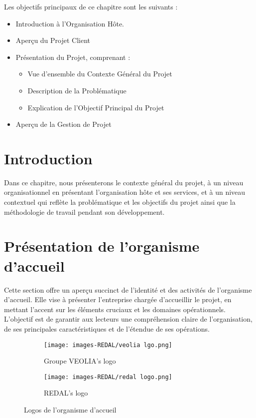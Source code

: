 \baselineskip=18pt

Les objectifs principaux de ce chapitre sont les suivants :
\begin{itemize}
    \item  Introduction à l'Organisation Hôte.
    \item  Aperçu du Projet Client
    \item  Présentation du Projet, comprenant :
    \begin{itemize}
        \item Vue d'ensemble du Contexte Général du Projet
        \item Description de la Problématique
        \item Explication de l'Objectif Principal du Projet
    \end{itemize}
    \item Aperçu de la Gestion de Projet
\end{itemize}
\newpage
\section{Introduction}
\quad Dans ce chapitre, nous présenterons le contexte général du projet, à un niveau organisationnel en présentant l'organisation hôte et ses services, et à un niveau contextuel qui reflète la problématique et les objectifs du projet ainsi que la méthodologie de travail pendant son développement.

\section{Présentation de l’organisme d’accueil}
\quad Cette section offre un aperçu succinct de l'identité et des activités de l'organisme d'accueil. Elle vise à présenter l'entreprise chargée d'accueillir le projet, en mettant l'accent sur les éléments cruciaux et les domaines opérationnels. L'objectif est de garantir aux lecteurs une compréhension claire de l'organisation, de ses principales caractéristiques et de l'étendue de ses opérations.

\medskip
\begin{figure}[!h]
    \centering
    \begin{subfigure}[b]{0.45\textwidth}
        \centering
        \texttt{[image: images-REDAL/veolia lgo.png]}
        \caption{Groupe VEOLIA's logo}
        \label{fig:2a}
    \end{subfigure}
    \hfill
    \begin{subfigure}[b]{0.36\textwidth}
        \centering
        \texttt{[image: images-REDAL/redal logo.png]}
        \caption{REDAL's logo}
        \label{fig:2b}
    \end{subfigure}
    \caption{Logos de l'organisme d'accueil}
    \label{fig:2}
\end{figure}


